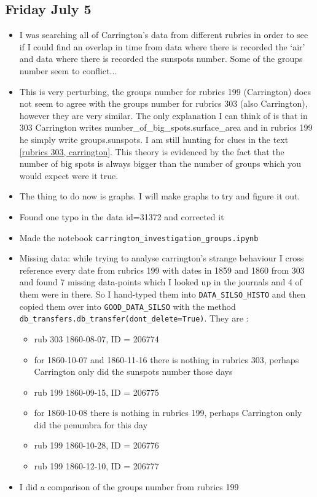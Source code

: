 \documentclass[12pt]{article}
\begin{document}
\subsection{Friday July 5}
\begin{itemize}
    \item I was searching all of Carrington's data from different rubrics in order to see if I could find an overlap in time from data where there is recorded the `air' and data where there is recorded the sunspots number. Some of the groups number seem to conflict...
    \item This is very perturbing, the groups number for rubrics 199 (Carrington) does not seem to agree with the groups number for rubrics 303 (also Carrington), however they are very similar. The only explanation I can think of is that in 303 Carrington writes number\_of\_big\_spots.surface\_area and in rubrics 199 he simply write groups.sunspots. I am still hunting for clues in the text \ref{rubrics 303, carrington}. This theory is evidenced by the fact that the number of big spots is always bigger than the number of groups which you would expect were it true.
    \item The thing to do now is graphs. I will make graphs to try and figure it out.
    \item Found one typo in the data id=31372 and corrected it
    \item Made the notebook \texttt{carrington\_investigation\_groups.ipynb}
    \item Missing data: while trying to analyse carrington's strange behaviour I cross reference every date from rubrics 199 with dates in 1859 and 1860 from 303 and found 7 missing data-points which I looked up in the journals and 4 of them were in there. So I hand-typed them into \texttt{DATA\_SILSO\_HISTO} and then copied them over into \texttt{GOOD\_DATA\_SILSO} with the method \texttt{db\_transfers.db\_transfer(dont\_delete=True)}. They are :
    \begin{itemize}
        \item rub 303 1860-08-07, ID = 206774
        \item for 1860-10-07 and 1860-11-16 there is nothing in rubrics 303, perhaps Carrington only did the sunspots number those days
        \item rub 199 1860-09-15, ID = 206775
        \item for 1860-10-08 there is nothing in rubrics 199, perhaps Carrington only did the penumbra for this day
        \item rub 199 1860-10-28, ID = 206776
        \item rub 199 1860-12-10, ID = 206777
    \end{itemize}
    \item I did a comparison of the groups number from rubrics 199


\end{itemize}
\end{document}
